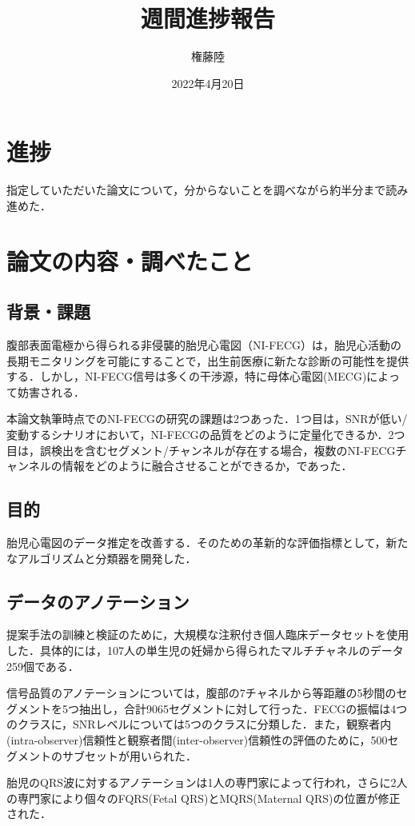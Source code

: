 \documentclass[dvipdfmx]{jsarticle}
\begin{document}
\title{週間進捗報告}
\author{権藤陸}
\date{2022年4月20日}
\maketitle
\section{進捗}
指定していただいた論文について，分からないことを調べながら約半分まで読み進めた．
\section{論文の内容・調べたこと}
\subsection{背景・課題}
腹部表面電極から得られる非侵襲的胎児心電図（NI-FECG）は，胎児心活動の長期モニタリングを可能にすることで，出生前医療に新たな診断の可能性を提供する．しかし，NI-FECG信号は多くの干渉源，特に母体心電図(MECG)によって妨害される．

本論文執筆時点でのNI-FECGの研究の課題は2つあった．1つ目は，SNRが低い/変動するシナリオにおいて，NI-FECGの品質をどのように定量化できるか．2つ目は，誤検出を含むセグメント/チャンネルが存在する場合，複数のNI-FECGチャンネルの情報をどのように融合させることができるか，であった．
\subsection{目的}
胎児心電図のデータ推定を改善する．そのための革新的な評価指標として，新たなアルゴリズムと分類器を開発した．
\subsection{データのアノテーション}
提案手法の訓練と検証のために，大規模な注釈付き個人臨床データセットを使用した．具体的には，107人の単生児の妊婦から得られたマルチチャネルのデータ259個である．

信号品質のアノテーションについては，腹部の7チャネルから等距離の5秒間のセグメントを5つ抽出し，合計9065セグメントに対して行った．FECGの振幅は4つのクラスに，SNRレベルについては5つのクラスに分類した．また，観察者内(intra-observer)信頼性と観察者間(inter-observer)信頼性の評価のために，500セグメントのサブセットが用いられた．

胎児のQRS波に対するアノテーションは1人の専門家によって行われ，さらに2人の専門家により個々のFQRS(Fetal QRS)とMQRS(Maternal QRS)の位置が修正された．
\end{document}
